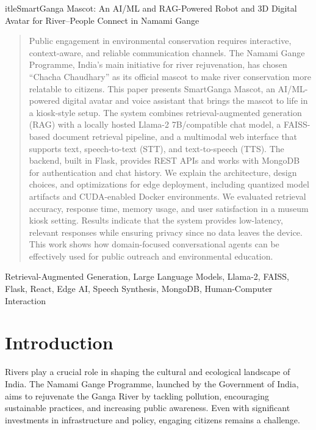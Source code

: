 \documentclass[conference]{IEEEtran}
\begin{document}
	itle{SmartGanga Mascot: An AI/ML and RAG-Powered Robot and 3D Digital Avatar for River--People Connect in Namami Gange}

\author{%
}

\maketitle

\begin{abstract}
Public engagement in environmental conservation requires interactive, context-aware, and reliable communication channels. The Namami Gange Programme, India’s main initiative for river rejuvenation, has chosen ``Chacha Chaudhary'' as its official mascot to make river conservation more relatable to citizens. This paper presents SmartGanga Mascot, an AI/ML-powered digital avatar and voice assistant that brings the mascot to life in a kiosk-style setup. The system combines retrieval-augmented generation (RAG) with a locally hosted Llama-2 7B/compatible chat model, a FAISS-based document retrieval pipeline, and a multimodal web interface that supports text, speech-to-text (STT), and text-to-speech (TTS). The backend, built in Flask, provides REST APIs and works with MongoDB for authentication and chat history. We explain the architecture, design choices, and optimizations for edge deployment, including quantized model artifacts and CUDA-enabled Docker environments. We evaluated retrieval accuracy, response time, memory usage, and user satisfaction in a museum kiosk setting. Results indicate that the system provides low-latency, relevant responses while ensuring privacy since no data leaves the device. This work shows how domain-focused conversational agents can be effectively used for public outreach and environmental education.
\end{abstract}

\begin{IEEEkeywords}
Retrieval-Augmented Generation, Large Language Models, Llama-2, FAISS, Flask, React, Edge AI, Speech Synthesis, MongoDB, Human-Computer Interaction
\end{IEEEkeywords}

\section{Introduction}
Rivers play a crucial role in shaping the cultural and ecological landscape of India. The Namami Gange Programme, launched by the Government of India, aims to rejuvenate the Ganga River by tackling pollution, encouraging sustainable practices, and increasing public awareness. Even with significant investments in infrastructure and policy, engaging citizens remains a challenge.
\end{document}
